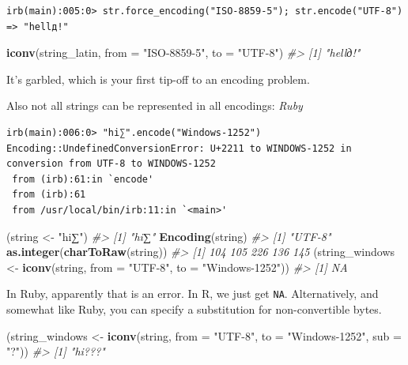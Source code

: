\documentclass[
]{book}
\newenvironment{Shaded}{\begin{snugshade}}{\end{snugshade}}
\newcommand{\CommentTok}[1]{\textcolor[rgb]{0.56,0.35,0.01}{\textit{#1}}}
\newcommand{\DataTypeTok}[1]{\textcolor[rgb]{0.13,0.29,0.53}{#1}}
\newcommand{\KeywordTok}[1]{\textcolor[rgb]{0.13,0.29,0.53}{\textbf{#1}}}
\newcommand{\NormalTok}[1]{#1}
\newcommand{\StringTok}[1]{\textcolor[rgb]{0.31,0.60,0.02}{#1}}
\begin{document}
\begin{verbatim}
irb(main):005:0> str.force_encoding("ISO-8859-5"); str.encode("UTF-8")
=> "hellд!"
\end{verbatim}

\begin{Shaded}
\begin{Highlighting}[]
\KeywordTok{iconv}\NormalTok{(string_latin, }\DataTypeTok{from =} \StringTok{"ISO-8859-5"}\NormalTok{, }\DataTypeTok{to =} \StringTok{"UTF-8"}\NormalTok{)}
\CommentTok{#> [1] "hellд!"}
\end{Highlighting}
\end{Shaded}

It's garbled, which is your first tip-off to an encoding problem.

Also not all strings can be represented in all encodings: \emph{Ruby}

\begin{verbatim}
irb(main):006:0> "hi∑".encode("Windows-1252")
Encoding::UndefinedConversionError: U+2211 to WINDOWS-1252 in conversion from UTF-8 to WINDOWS-1252
 from (irb):61:in `encode'
 from (irb):61
 from /usr/local/bin/irb:11:in `<main>'
\end{verbatim}

\begin{Shaded}
\begin{Highlighting}[]
\NormalTok{(string <-}\StringTok{ "hi∑"}\NormalTok{)}
\CommentTok{#> [1] "hi∑"}
\KeywordTok{Encoding}\NormalTok{(string)}
\CommentTok{#> [1] "UTF-8"}
\KeywordTok{as.integer}\NormalTok{(}\KeywordTok{charToRaw}\NormalTok{(string))}
\CommentTok{#> [1] 104 105 226 136 145}
\NormalTok{(string_windows <-}\StringTok{ }\KeywordTok{iconv}\NormalTok{(string, }\DataTypeTok{from =} \StringTok{"UTF-8"}\NormalTok{, }\DataTypeTok{to =} \StringTok{"Windows-1252"}\NormalTok{))}
\CommentTok{#> [1] NA}
\end{Highlighting}
\end{Shaded}

In Ruby, apparently that is an error. In R, we just get \texttt{NA}. Alternatively, and somewhat like Ruby, you can specify a substitution for non-convertible bytes.

\begin{Shaded}
\begin{Highlighting}[]
\NormalTok{(string_windows <-}\StringTok{ }\KeywordTok{iconv}\NormalTok{(string, }\DataTypeTok{from =} \StringTok{"UTF-8"}\NormalTok{, }\DataTypeTok{to =} \StringTok{"Windows-1252"}\NormalTok{, }\DataTypeTok{sub =} \StringTok{"?"}\NormalTok{))}
\CommentTok{#> [1] "hi???"}
\end{Highlighting}
\end{Shaded}
\end{document}
